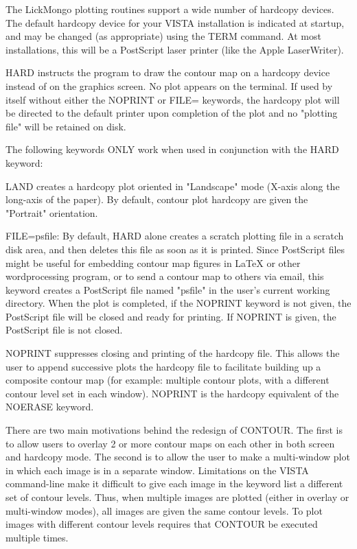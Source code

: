  
The LickMongo plotting routines support a wide number of hardcopy devices.
The default hardcopy device for your VISTA installation is indicated at
startup, and may be changed (as appropriate) using the TERM command.  At
most installations, this will be a PostScript laser printer (like the Apple
LaserWriter).
 
HARD instructs the program to draw the contour map on a hardcopy device
instead of on the graphics screen.  No plot appears on the terminal.  If
used by itself without either the NOPRINT or FILE= keywords, the hardcopy
plot will be directed to the default printer upon completion of the plot
and no "plotting file" will be retained on disk.
 
The following keywords ONLY work when used in conjunction with the HARD
keyword:
 
LAND creates a hardcopy plot oriented in "Landscape" mode (X-axis along the
long-axis of the paper).  By default, contour plot hardcopy are given the
"Portrait" orientation.
 
FILE=psfile: By default, HARD alone creates a scratch plotting file in a
scratch disk area, and then deletes this file as soon as it is printed.
Since PostScript files might be useful for embedding contour map figures in
LaTeX or other wordprocessing program, or to send a contour map to others
via email, this keyword creates a PostScript file named "psfile" in the
user's current working directory.  When the plot is completed, if the
NOPRINT keyword is not given, the PostScript file will be closed and ready
for printing.  If NOPRINT is given, the PostScript file is not closed.
 
NOPRINT suppresses closing and printing of the hardcopy file.  This allows
the user to append successive plots the hardcopy file to facilitate
building up a composite contour map (for example: multiple contour plots,
with a different contour level set in each window).  NOPRINT is the
hardcopy equivalent of the NOERASE keyword.

 
There are two main motivations behind the redesign of CONTOUR.  The first
is to allow users to overlay 2 or more contour maps on each other in both
screen and hardcopy mode.  The second is to allow the user to make a
multi-window plot in which each image is in a separate window.  Limitations
on the VISTA command-line make it difficult to give each image in the
keyword list a different set of contour levels.  Thus, when multiple images
are plotted (either in overlay or multi-window modes), all images are given
the same contour levels.  To plot images with different contour levels
requires that CONTOUR be executed multiple times.
 
